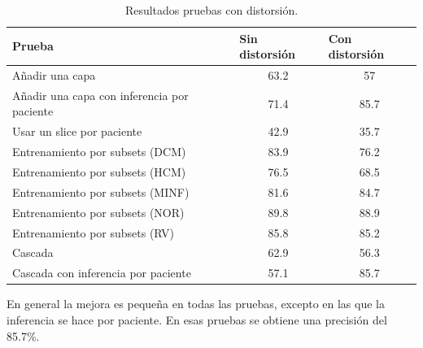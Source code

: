 \documentclass[12pt,a4paper]{article}
\begin{document}
\begin{table}[H]
\centering
\begin{tabular}{|l|c|c|}
\hline
\textbf{Prueba}                             & \multicolumn{1}{l|}{\textbf{Sin distorsión}} & \multicolumn{1}{l|}{\textbf{Con distorsión}} \\ \hline
Añadir una capa                             & 63.2                                         & 57                                           \\ \hline
Añadir una capa con inferencia por paciente & 71.4                                         & 85.7                                         \\ \hline
Usar un slice por paciente                  & 42.9                                         & 35.7                                         \\ \hline
Entrenamiento por subsets (DCM)             & 83.9                                         & 76.2                                         \\ \hline
Entrenamiento por subsets (HCM)             & 76.5                                         & 68.5                                         \\ \hline
Entrenamiento por subsets (MINF)            & 81.6                                         & 84.7                                         \\ \hline
Entrenamiento por subsets (NOR)             & 89.8                                         & 88.9                                         \\ \hline
Entrenamiento por subsets (RV)              & 85.8                                         & 85.2                                         \\ \hline
Cascada                                     & 62.9                                         & 56.3                                         \\ \hline
Cascada con inferencia por paciente         & 57.1                                         & 85.7                                         \\ \hline
\end{tabular}
\caption{Resultados pruebas con distorsión.}
\end{table}

En general la mejora es pequeña en todas las pruebas, excepto en las que la inferencia se hace por paciente. En esas pruebas se obtiene una precisión del 85.7\%.
\end{document}
